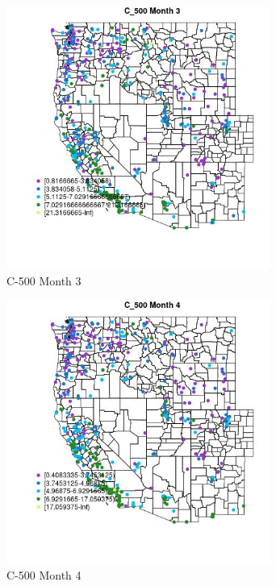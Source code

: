 \begin{figure} 
\centering  
\includegraphics[width=0.77\textwidth]{Code_Outputs/ML_input_report_ML_input_PM25_Step5_part_d_de_duplicated_aves_ML_input_MapObsMo3C_500.jpg} 
\caption{\label{fig:ML_input_report_ML_input_PM25_Step5_part_d_de_duplicated_aves_ML_inputMapObsMo3C_500}C-500 Month 3} 
\end{figure} 
 

\clearpage 

\begin{figure} 
\centering  
\includegraphics[width=0.77\textwidth]{Code_Outputs/ML_input_report_ML_input_PM25_Step5_part_d_de_duplicated_aves_ML_input_MapObsMo4C_500.jpg} 
\caption{\label{fig:ML_input_report_ML_input_PM25_Step5_part_d_de_duplicated_aves_ML_inputMapObsMo4C_500}C-500 Month 4} 
\end{figure} 
 

